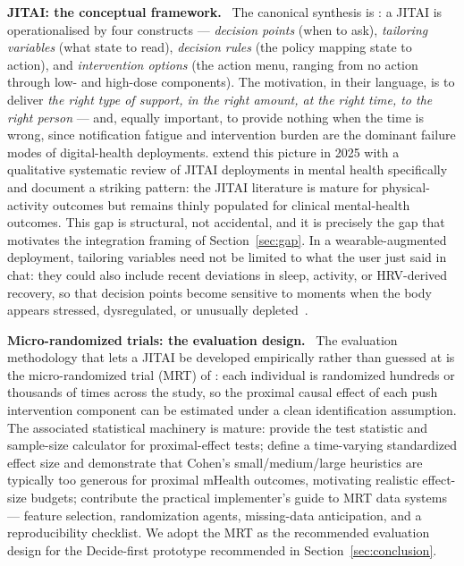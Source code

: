 \documentclass[10pt,conference]{article}
\newcommand{\secref}[1]{Section~\ref{#1}}
\renewcommand{\paragraph}[1]{\smallskip\par\noindent\textbf{#1}~\ignorespaces}
\begin{document}
\paragraph{JITAI: the conceptual framework.}
The canonical synthesis is \cite{NahumShani2018JITAI}: a JITAI is
operationalised by four constructs --- \emph{decision points} (when to
ask), \emph{tailoring variables} (what state to read), \emph{decision
rules} (the policy mapping state to action), and \emph{intervention
options} (the action menu, ranging from no action through low- and
high-dose components). The motivation, in their language, is to
deliver \emph{the right type of support, in the right amount, at the
right time, to the right person} --- and, equally important, to
provide nothing when the time is wrong, since notification fatigue and
intervention burden are the dominant failure modes of digital-health
deployments. \cite{NahumShani2025JITAIMHReview} extend this picture
in 2025 with a qualitative systematic review of JITAI deployments in
mental health specifically and document a striking pattern: the
JITAI literature is mature for physical-activity outcomes but
remains thinly populated for clinical mental-health outcomes. This
gap is structural, not accidental, and it is precisely the gap that
motivates the integration framing of \secref{sec:gap}.
In a wearable-augmented deployment, tailoring variables need not be
limited to what the user just said in chat: they could also include
recent deviations in sleep, activity, or HRV-derived recovery, so that
decision points become sensitive to moments when the body appears
stressed, dysregulated, or unusually depleted~\cite{Sequeira2021PassiveSensing,Laborde2017HRV}.

\paragraph{Micro-randomized trials: the evaluation design.}
The evaluation methodology that lets a JITAI be developed empirically
rather than guessed at is the micro-randomized trial (MRT)
of \cite{Klasnja2015MRT}: each individual is randomized hundreds or
thousands of times across the study, so the proximal causal effect of
each push intervention component can be estimated under a clean
identification assumption. The associated statistical machinery is
mature: \cite{Liao2016MRTSampleSize} provide the test statistic and
sample-size calculator for proximal-effect tests; \cite{Luers2018StandardizedEffect}
define a time-varying standardized effect size and demonstrate that
Cohen's small/medium/large heuristics are typically too generous for
proximal mHealth outcomes, motivating realistic effect-size budgets;
\cite{Seewald2019MRTData} contribute the practical implementer's
guide to MRT data systems --- feature selection, randomization
agents, missing-data anticipation, and a reproducibility checklist. We
adopt the MRT as the recommended evaluation design for the
Decide-first prototype recommended in \secref{sec:conclusion}.
\end{document}
